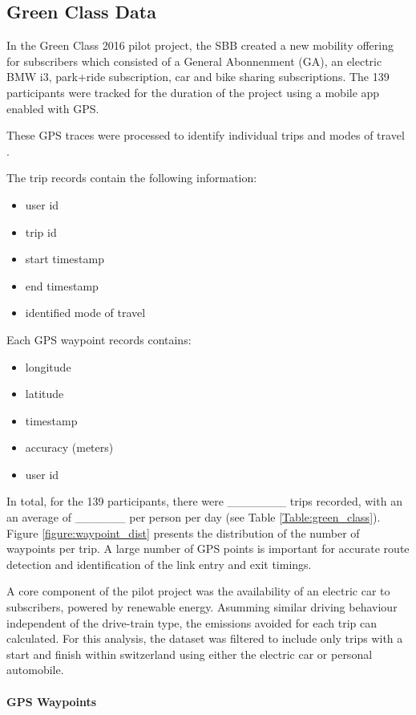 

\subsection{Green Class Data}
In the Green Class 2016 pilot project, the SBB created a new mobility offering for subscribers which consisted of a General Abonnenment (GA), an electric BMW i3, park+ride subscription, car and bike sharing subscriptions.
The 139 participants were tracked for the duration of the project using a mobile app enabled with GPS.

 These GPS traces were processed to identify individual trips and modes of travel \cite{rabaul2016greenclassprocessing}.

The trip records contain the following information:
\begin{itemize}
  \item user id
  \item trip id
  \item start timestamp
  \item end timestamp
  \item identified mode of travel
\end{itemize}

Each GPS waypoint records contains: 
\begin{itemize}
  \item longitude
  \item latitude
  \item timestamp
  \item accuracy (meters)
  \item user id
\end{itemize}


In total, for the 139 participants, there were _______ trips recorded, with an an average of ______ per person per day (see Table \ref{Table:green_class}). Figure \ref{figure:waypoint_dist} presents the distribution of the number of waypoints per trip. A large number of GPS points is important for accurate route detection and identification of the link entry and exit timings.

A core component of the pilot project was the availability of an electric car to subscribers, powered by renewable energy.
Asumming similar driving behaviour independent of the drive-train type, the emissions avoided for each trip can calculated.
For this analysis, the dataset was filtered to include only trips with a start and finish within switzerland using either the electric car or personal automobile. 

\paragraph{GPS Waypoints}


